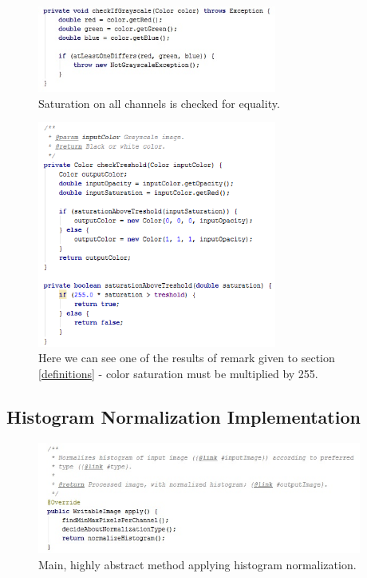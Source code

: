 \documentclass{article}
\begin{document}
\begin{figure}[H]
	\centering
	\includegraphics[width=0.7\textwidth, left]{_Figures/notGrayscale.jpg}
	\caption{Saturation on all channels is checked for equality.}
	\label{fig:not_grayscale}
\end{figure}
	
\begin{figure}[H]
	\centering
	\includegraphics[width=0.7\textwidth]{_Figures/treshold_check.png}
	\caption{Here we can see one of the results of remark given to section \ref{definitions} - color saturation must be multiplied by 255.}
\end{figure}

%
%
\subsection{Histogram Normalization Implementation}

\begin{figure}[H]
	\centering
	\includegraphics[width=0.95\textwidth]{_Figures/normalization_function.jpg}
	\caption{Main, highly abstract method applying histogram normalization.}
\end{figure}
\end{document}
